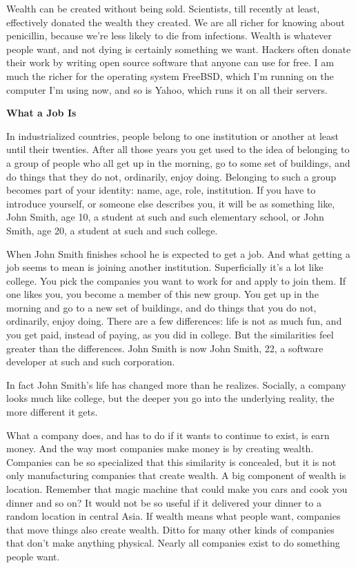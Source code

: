 Wealth can be created without being sold. Scientists, till recently at
least, effectively donated the wealth they created. We are all richer
for knowing about penicillin, because we're less likely to die from
infections. Wealth is whatever people want, and not dying is certainly
something we want. Hackers often donate their work by writing open
source software that anyone can use for free. I am much the richer for
the operating system FreeBSD, which I'm running on the computer I'm
using now, and so is Yahoo, which runs it on all their servers.

\textbf{What a Job Is}

In industrialized countries, people belong to one institution or another
at least until their twenties. After all those years you get used to the
idea of belonging to a group of people who all get up in the morning, go
to some set of buildings, and do things that they do not, ordinarily,
enjoy doing. Belonging to such a group becomes part of your identity:
name, age, role, institution. If you have to introduce yourself, or
someone else describes you, it will be as something like, John Smith,
age 10, a student at such and such elementary school, or John Smith, age
20, a student at such and such college.

When John Smith finishes school he is expected to get a job. And what
getting a job seems to mean is joining another institution.
Superficially it's a lot like college. You pick the companies you want
to work for and apply to join them. If one likes you, you become a
member of this new group. You get up in the morning and go to a new set
of buildings, and do things that you do not, ordinarily, enjoy doing.
There are a few differences: life is not as much fun, and you get paid,
instead of paying, as you did in college. But the similarities feel
greater than the differences. John Smith is now John Smith, 22, a
software developer at such and such corporation.

In fact John Smith's life has changed more than he realizes. Socially, a
company looks much like college, but the deeper you go into the
underlying reality, the more different it gets.

What a company does, and has to do if it wants to continue to exist, is
earn money. And the way most companies make money is by creating wealth.
Companies can be so specialized that this similarity is concealed, but
it is not only manufacturing companies that create wealth. A big
component of wealth is location. Remember that magic machine that could
make you cars and cook you dinner and so on? It would not be so useful
if it delivered your dinner to a random location in central Asia. If
wealth means what people want, companies that move things also create
wealth. Ditto for many other kinds of companies that don't make anything
physical. Nearly all companies exist to do something people want.

